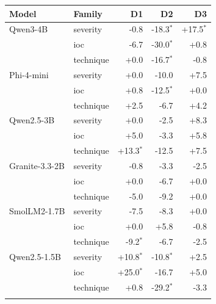 \begin{tabular}{@{}llrrr@{}}
\toprule
Model & Family & D1 & D2 & D3 \\
\midrule
Qwen3-4B & severity & -0.8 & -18.3$^{*}$ & +17.5$^{*}$ \\
 & ioc & -6.7 & -30.0$^{*}$ & +0.8 \\
 & technique & +0.0 & -16.7$^{*}$ & -0.8 \\
\addlinespace[1pt]
Phi-4-mini & severity & +0.0 & -10.0 & +7.5 \\
 & ioc & +0.8 & -12.5$^{*}$ & +0.0 \\
 & technique & +2.5 & -6.7 & +4.2 \\
\addlinespace[1pt]
Qwen2.5-3B & severity & +0.0 & -2.5 & +8.3 \\
 & ioc & +5.0 & -3.3 & +5.8 \\
 & technique & +13.3$^{*}$ & -12.5 & +7.5 \\
\addlinespace[1pt]
Granite-3.3-2B & severity & -0.8 & -3.3 & -2.5 \\
 & ioc & +0.0 & -6.7 & +0.0 \\
 & technique & -5.0 & -9.2 & +0.0 \\
\addlinespace[1pt]
SmolLM2-1.7B & severity & -7.5 & -8.3 & +0.0 \\
 & ioc & +0.0 & +5.8 & -0.8 \\
 & technique & -9.2$^{*}$ & -6.7 & -2.5 \\
\addlinespace[1pt]
Qwen2.5-1.5B & severity & +10.8$^{*}$ & -10.8$^{*}$ & +2.5 \\
 & ioc & +25.0$^{*}$ & -16.7 & +5.0 \\
 & technique & +0.8 & -29.2$^{*}$ & -3.3 \\
\addlinespace[1pt]
\bottomrule
\end{tabular}